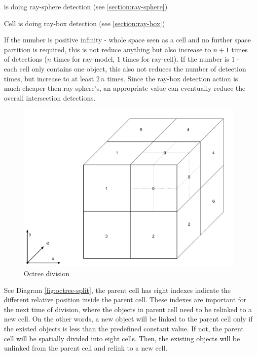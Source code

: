 \begin{description}
	\setlength{\parskip}{0pt}
	\item[$\bullet$ Object Complexity]  is doing ray-sphere detection (see \ref{section:ray-sphere})
	\item[$\bullet$ Cell Complexity] Cell is doing ray-box detection (see \ref{section:ray-box})
\end{description}

If the number is positive infinity - whole space seen as a cell and no further space partition is required, this is not reduce anything but also increase to $n + 1$ times of detections ($n$ times for ray-model, $1$ times for ray-cell). If the number is $1$ - each cell only contains one object, this also not reduces the number of detection times, but increase to at least $2\,n$ times. Since the ray-box detection action is much cheaper then ray-sphere's, an appropriate value can eventually reduce the overall intersection detections.

\begin{figure}[H]
\caption{Octree division}
\label{fig:octree-division}
\centering
\includegraphics[width=\textwidth, keepaspectratio]{Figures/octree-division.png}
\decoRule
\end{figure}

See Diagram \ref{fig:octree-split}, the parent cell has eight indexes indicate the different relative position inside the parent cell. These indexes are important for the next time of division, where the objects in parent cell need to be relinked to a new cell. On the other words, a new object will be linked to the parent cell only if the existed objects is less than the predefined constant value. If not, the parent cell will be spatially divided into eight cells. Then, the existing objects will be unlinked from the parent cell and relink to a new cell.

